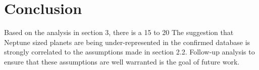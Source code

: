 \documentclass[
10pt, %
a4paper, %
oneside, %
headinclude,footinclude, %
BCOR5mm, %
]{scrartcl}
\begin{document}

\section{Conclusion}
Based on the analysis in section 3, there is a 15 to 20%
The suggestion that Neptune sized planets are being under-represented in the confirmed database is strongly correlated to the assumptions made in section 2.2. Follow-up analysis to ensure that these assumptions are well warranted is the goal of future work. 


\renewcommand{\refname}{\spacedlowsmallcaps{References}} %


%


\end{document}
